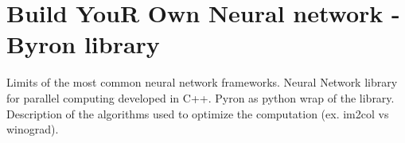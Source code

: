 \documentclass{standalone}
\begin{document}
\section[Byron]{Build YouR Own Neural network - Byron library}\label{byron}

Limits of the most common neural network frameworks.
Neural Network library for parallel computing developed in C++.
Pyron as python wrap of the library.
Description of the algorithms used to optimize the computation (ex. im2col vs winograd).
\end{document}
